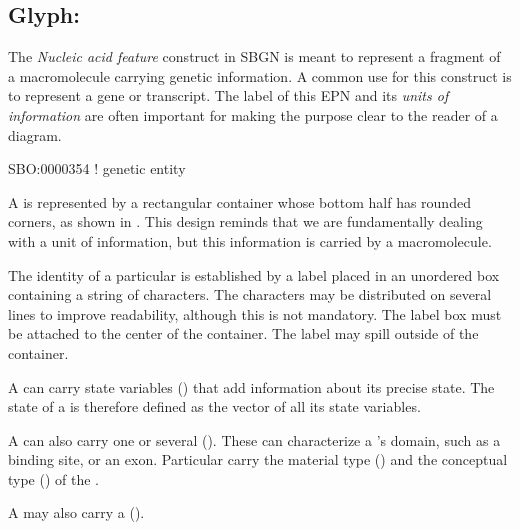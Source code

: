 
\subsection{Glyph: }
\label{sec:genetic}

The \emph{Nucleic acid feature} construct in SBGN is meant to represent a fragment of a macromolecule carrying genetic information.  A common use for this construct is to represent a gene or transcript.  The label of this EPN and its \emph{units of information} are often important for making the purpose clear to the reader of a diagram.

\begin{glyphDescription}

\glyphSboTerm SBO:0000354 ! genetic entity

\glyphContainer A  is represented by a rectangular container whose bottom half has rounded corners, as shown in . This design reminds that we are fundamentally dealing with a unit of information, but this information is carried by a macromolecule.

\glyphLabel The identity of a particular  is established by a label placed in an unordered box containing a string of characters.  The characters may be distributed on several lines to improve readability, although this is not mandatory.  The label box must be attached to the center of the container.  The label may spill outside of the container.

\glyphAux A  can carry state variables () that add information about its precise state.  The state of a  is therefore defined as the vector of all its state variables. 

A  can also carry one or several  ().  These can characterize a 's domain, such as a binding site, or an exon.  Particular  carry the material type () and the conceptual type () of the . 

A  may also carry a 
().

\end{glyphDescription}


